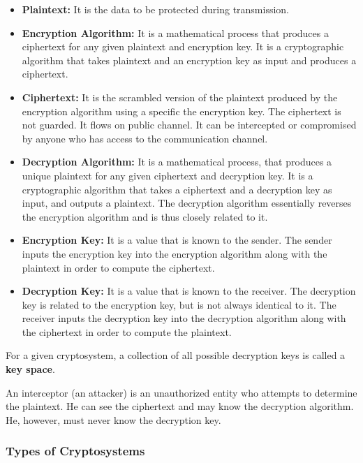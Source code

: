 \documentclass[11pt]{article}
\begin{document}
\begin{itemize}
\item
  \textbf{Plaintext:} It is the data to be protected during
  transmission.
\item
  \textbf{Encryption Algorithm:} It is a mathematical process that
  produces a ciphertext for any given plaintext and encryption key. It
  is a cryptographic algorithm that takes plaintext and an encryption
  key as input and produces a ciphertext.
\item
  \textbf{Ciphertext:} It is the scrambled version of the plaintext
  produced by the encryption algorithm using a specific the encryption
  key. The ciphertext is not guarded. It flows on public channel. It can
  be intercepted or compromised by anyone who has access to the
  communication channel.
\item
  \textbf{Decryption Algorithm:} It is a mathematical process, that
  produces a unique plaintext for any given ciphertext and decryption
  key. It is a cryptographic algorithm that takes a ciphertext and a
  decryption key as input, and outputs a plaintext. The decryption
  algorithm essentially reverses the encryption algorithm and is thus
  closely related to it.
\item
  \textbf{Encryption Key:} It is a value that is known to the sender.
  The sender inputs the encryption key into the encryption algorithm
  along with the plaintext in order to compute the ciphertext.
\item
  \textbf{Decryption Key:} It is a value that is known to the receiver.
  The decryption key is related to the encryption key, but is not always
  identical to it. The receiver inputs the decryption key into the
  decryption algorithm along with the ciphertext in order to compute the
  plaintext.
\end{itemize}

For a given cryptosystem, a collection of all possible decryption keys
is called a \textbf{key space}.

An interceptor (an attacker) is an unauthorized entity who attempts to
determine the plaintext. He can see the ciphertext and may know the
decryption algorithm. He, however, must never know the decryption key.

\hypertarget{types-of-cryptosystems}{%
\subsubsection{Types of Cryptosystems}\label{types-of-cryptosystems}}
\end{document}
